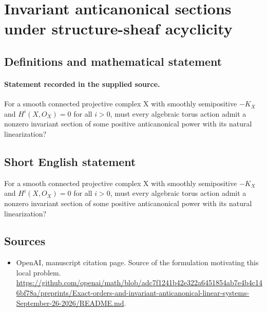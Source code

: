 \documentclass[11pt]{article}
\begin{document}
\section*{Invariant anticanonical sections under structure-sheaf acyclicity}\label{statement}
\subsection{Definitions and mathematical statement}
\paragraph{Statement recorded in the supplied source.}
For a smooth connected projective complex X with smoothly semipositive $-K_X$ and $H^i(X,O_X)=0$ for all $i>0$, must every algebraic torus action admit a nonzero invariant section of some positive anticanonical power with its natural linearization?
\subsection{Short English statement}
For a smooth connected projective complex X with smoothly semipositive $-K_X$ and $H^i(X,O_X)=0$ for all $i>0$, must every algebraic torus action admit a nonzero invariant section of some positive anticanonical power with its natural linearization?
\subsection{Sources}
\begin{itemize}
\item[S1] OpenAI, manuscript citation page. Source of the formulation motivating this local problem.
\url{https://github.com/openai/math/blob/adc7f1241b42e322a6451854ab7e4b4c146bf78a/preprints/Exact-orders-and-invariant-anticanonical-linear-systems-September-26-2026/README.md}.
\end{itemize}
\end{document}
